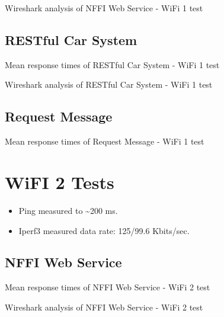 \begin{appendices}
\begin{table}[H]

\caption{Wireshark analysis of NFFI Web Service - WiFi 1 test}
\end{table}

\subsection{RESTful Car System}

\begin{table}[H]

\caption{Mean response times of RESTful Car System - WiFi 1 test}
\end{table}

\begin{table}[H]

\caption{Wireshark analysis of RESTful Car System - WiFi 1 test}
\end{table}


\subsection{Request Message}
\begin{table}[H]

\caption{Mean response times of Request Message - WiFi 1 test}
\end{table}


\section{WiFI 2 Tests}

\begin{itemize}
	\item Ping measured to \textasciitilde 200 ms.
	\item Iperf3 measured data rate: 125/99.6 Kbits/sec.
\end{itemize}

\subsection{NFFI Web Service}

\begin{table}[H]

\caption{Mean response times of NFFI Web Service - WiFi 2 test}
\end{table}

\begin{table}[H]

\caption{Wireshark analysis of NFFI Web Service - WiFi 2 test}
\end{table}


\end{appendices}
